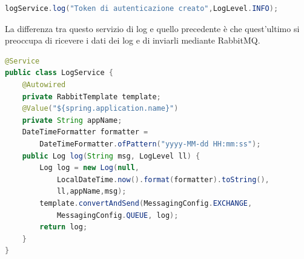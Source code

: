 \begin{lstlisting}[language=Java, caption=Invio dati di log, basicstyle=\footnotesize]
logService.log("Token di autenticazione creato",LogLevel.INFO);
\end{lstlisting}

La differenza tra questo servizio di log e quello precedente è che quest'ultimo si preoccupa di ricevere i dati dei log e di inviarli mediante RabbitMQ.
\begin{lstlisting}[language=Java, caption=Frammento della classe LogService - microservizi, basicstyle=\footnotesize]
@Service
public class LogService {
    @Autowired
    private RabbitTemplate template;
    @Value("${spring.application.name}")
    private String appName;
    DateTimeFormatter formatter = 
        DateTimeFormatter.ofPattern("yyyy-MM-dd HH:mm:ss");
    public Log log(String msg, LogLevel ll) {        
        Log log = new Log(null,
            LocalDateTime.now().format(formatter).toString(),
            ll,appName,msg);
        template.convertAndSend(MessagingConfig.EXCHANGE, 
            MessagingConfig.QUEUE, log);
        return log;
    }
}
\end{lstlisting}